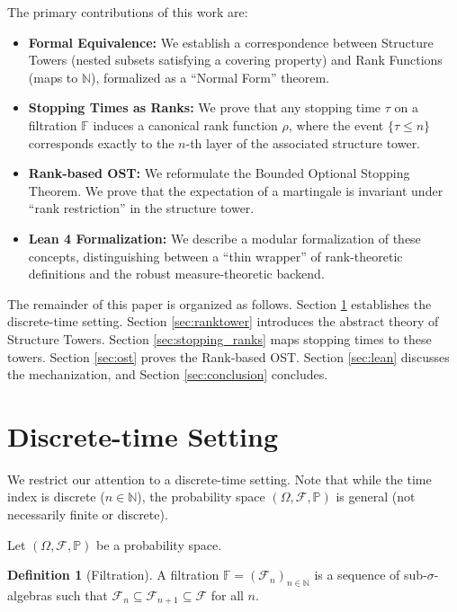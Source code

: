 \documentclass[11pt, a4paper]{article}
\newcommand{\rank}{\rho}
\newcommand{\Filtration}{\mathbb{F}}
\newcommand{\Nat}{\mathbb{N}}
\newcommand{\Prob}{\mathbb{P}}
\theoremstyle{plain}
\theoremstyle{definition}
\newtheorem{definition}[theorem]{Definition}
\theoremstyle{remark}
\begin{document}
The primary contributions of this work are:
\begin{itemize}
    \item \textbf{Formal Equivalence:} We establish a correspondence between Structure Towers (nested subsets satisfying a covering property) and Rank Functions (maps to $\Nat$), formalized as a ``Normal Form'' theorem.
    \item \textbf{Stopping Times as Ranks:} We prove that any stopping time $\tau$ on a filtration $\Filtration$ induces a canonical rank function $\rank$, where the event $\{\tau \le n\}$ corresponds exactly to the $n$-th layer of the associated structure tower.
    \item \textbf{Rank-based OST:} We reformulate the Bounded Optional Stopping Theorem. We prove that the expectation of a martingale is invariant under ``rank restriction'' in the structure tower.
    \item \textbf{Lean 4 Formalization:} We describe a modular formalization of these concepts, distinguishing between a ``thin wrapper'' of rank-theoretic definitions and the robust measure-theoretic backend.
\end{itemize}

The remainder of this paper is organized as follows. Section \ref{sec:discrete} establishes the discrete-time setting. Section \ref{sec:ranktower} introduces the abstract theory of Structure Towers. Section \ref{sec:stopping_ranks} maps stopping times to these towers. Section \ref{sec:ost} proves the Rank-based OST. Section \ref{sec:lean} discusses the mechanization, and Section \ref{sec:conclusion} concludes.

\section{Discrete-time Setting} \label{sec:discrete}

We restrict our attention to a discrete-time setting. Note that while the time index is discrete ($n \in \Nat$), the probability space $(\Omega, \mathcal{F}, \Prob)$ is general (not necessarily finite or discrete).

Let $(\Omega, \mathcal{F}, \Prob)$ be a probability space.
\begin{definition}[Filtration]
A filtration $\Filtration = (\mathcal{F}_n)_{n \in \Nat}$ is a sequence of sub-$\sigma$-algebras such that $\mathcal{F}_n \subseteq \mathcal{F}_{n+1} \subseteq \mathcal{F}$ for all $n$.
\end{definition}
\end{document}
